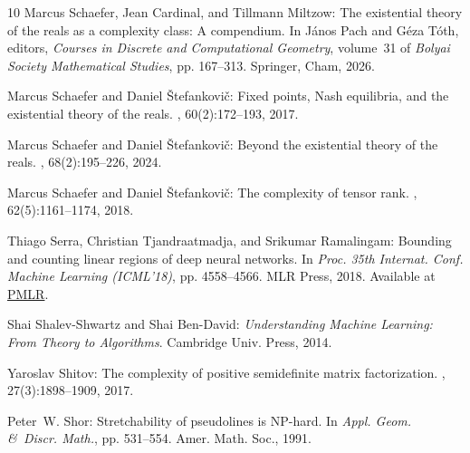 \begin{thebibliography}{10}
{\sc Marcus Schaefer, Jean Cardinal, and Tillmann Miltzow}: The existential
  theory of the reals as a complexity class: {A} compendium.
\newblock In {\sc J{\'a}nos Pach and G{\'e}za T{\'o}th}, editors, {\em Courses
  in Discrete and Computational Geometry}, volume~31 of {\em Bolyai Society
  Mathematical Studies}, pp. 167--313. Springer, Cham, 2026.

{\sc Marcus Schaefer and Daniel {\v{S}}tefankovi{\v{c}}}: Fixed points, {N}ash
  equilibria, and the existential theory of the reals.
, 60(2):172--193, 2017.
\newblock [\epfmtdoi{10.1007/s00224-015-9662-0}]

{\sc Marcus Schaefer and Daniel {\v{S}}tefankovi{\v{c}}}: Beyond the
  existential theory of the reals.
, 68(2):195--226, 2024.
\newblock [\epfmtdoi{10.1007/s00224-023-10151-x}]

{\sc Marcus Schaefer and Daniel \v{S}tefankovi\v{c}}: The complexity of tensor
  rank.
, 62(5):1161--1174, 2018.
\newblock [\epfmtdoi{10.1007/s00224-017-9800-y}]

{\sc Thiago Serra, Christian Tjandraatmadja, and Srikumar Ramalingam}: Bounding
  and counting linear regions of deep neural networks.
\newblock In {\em Proc. 35th Internat. Conf. Machine Learning (ICML'18)}, pp.
  4558--4566. MLR Press, 2018.
\newblock Available at
  \href{https://proceedings.mlr.press/v80/serra18b.html}{PMLR}.

{\sc Shai Shalev-Shwartz and Shai Ben-David}: {\em Understanding Machine
  Learning: From Theory to Algorithms}.
\newblock Cambridge Univ. Press, 2014.

{\sc Yaroslav Shitov}: The complexity of positive semidefinite matrix
  factorization.
, 27(3):1898--1909, 2017.
\newblock [\epfmtdoi{10.1137/16M1080616}]

{\sc Peter~W. Shor}: Stretchability of pseudolines is {NP}-hard.
\newblock In {\em Appl. Geom. \&\ Discr. Math.}, pp. 531--554. Amer. Math.
  Soc., 1991.


\end{thebibliography}
